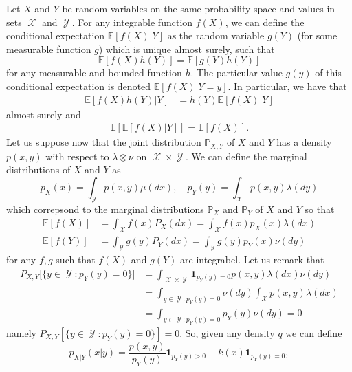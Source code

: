\documentclass[
	fontsize=11pt, %
	twoside=false, %
	numbers=noenddot, %
]{kaobook}
\DeclareMathOperator{\cX}{\mathcal X}
\DeclareMathOperator{\cY}{\mathcal Y}
\renewcommand{\P}{\mathbb P}
\newcommand{\E}{\mathbb E}
\newcommand{\ind}[1]{\mathbf 1_{#1}}
\begin{document}
Let $X$ and $Y$ be random variables on the same probability space and values in sets $\cX$ and $\cY$.
For any integrable function $f(X)$, we can define the conditional expectation $\E [f(X) | Y]$ as the random variable $g(Y)$ (for some measurable function $g$) which is unique almost surely, such that
\begin{equation}
	\E[f(X) h(Y)] = \E[ g(Y) h(Y)]
\end{equation}
for any measurable and bounded function $h$.
The particular value $g(y)$ of this conditional expectation is denoted $\E[f(X) | Y = y]$. 
In particular, we have that
\begin{align*}
	\E[f(X) h(Y) | Y] &= h(Y) \E[ f(X) | Y]
\end{align*}
almost surely and
\begin{align}
	\E [\E[ f(X) | Y]] = \E[f(X)].
\end{align}
Let us suppose now that the joint distribution $\P_{X, Y}$ of $X$ and $Y$ has a density $p(x, y)$ with respect to $\lambda \otimes \nu$ on $\cX \times \cY$.
We can define the marginal distributions of $X$ and $Y$ as
\begin{equation*}
	p_X(x) = \int_{\cY} p(x, y) \mu(dx), \quad
	p_Y(y) = \int_{\cX} p(x, y) \lambda(dy)
\end{equation*}
which correpsond to the marginal distributions $\P_X$ and $\P_Y$ of $X$ and $Y$ so that
\begin{align*}
	\E[f(X)] &= \int_{\cX} f(x) P_X(dx) = \int_{\cX} f(x) p_X(x) \lambda(dx) \\ 
	\E[f(Y)] &= \int_{\cY} g(y) P_Y(dx) = \int_{\cY} g(y) p_Y(x) \nu(dy)
\end{align*}
for any $f, g$ such that $f(X)$ and $g(Y)$ are integrabel. 
Let us remark that
\begin{align*}
	P_{X, Y} \big[ \{ y \in \cY : p_Y(y) = 0 \} \big] &= \int_{\cX \times \cY} \ind{p_Y(y) = 0} p(x, y) \lambda(dx) \nu(dy) \\
	&= \int_{y \in \cY : p_Y(y) = 0} \nu(dy) \int_{\cX} p(x, y) \lambda (dx) \\
	&= \int_{y \in \cY : p_Y(y) = 0} p_Y(y) \nu(dy) = 0
\end{align*}
namely $P_{X, Y}[ \{ y \in \cY : p_Y(y) = 0 \}] = 0$.
So, given any density $q$ we can define
\begin{equation*}
	p_{X | Y}(x | y) = \frac{p(x, y)}{p_Y(y)} \ind{p_Y(y) > 0} + k(x) \ind{p_Y(y) = 0},
\end{equation*}
\end{document}
